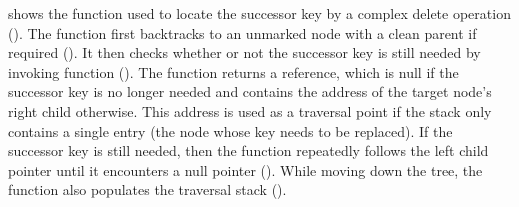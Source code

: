  shows the function \SeekForSuccessor{} used to locate the successor key by a complex delete operation (). The function first backtracks to an unmarked node with a clean parent if required (). It then checks whether or not the successor key is still needed by invoking \NeedSuccessorKey{} function (). The function \NeedSuccessorKey{} returns a reference, which is null if the successor key is no longer needed and contains the address of the target node's right child otherwise. This address is used as a traversal point if the stack only contains a single entry (the node whose key needs to be replaced). If the successor key is still needed, then the function repeatedly follows the left child pointer until it encounters a null pointer (). While moving down the tree, the function also populates the traversal stack ().
